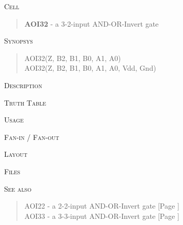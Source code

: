 
\label{AOI32}
\textsc{Cell}
\begin{quote}
    \textbf{AOI32} - a 3-2-input AND-OR-Invert gate
\end{quote}

\textsc{Synopsys}
\begin{quote}
    AOI32(Z, B2, B1, B0, A1, A0) \\
    AOI32(Z, B2, B1, B0, A1, A0, Vdd, Gnd)
\end{quote}

\textsc{Description}

%

\textsc{Truth Table}


\textsc{Usage}

\textsc{Fan-in / Fan-out}

\textsc{Layout}

\textsc{Files}

\textsc{See also}
\begin{quote}
    AOI22 - a 2-2-input AND-OR-Invert gate [Page \pageref{AOI22}] \\
    AOI33 - a 3-3-input AND-OR-Invert gate [Page \pageref{AOI33}]
\end{quote}
